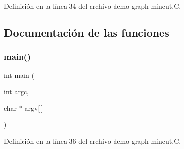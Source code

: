 Definición en la línea 34 del archivo demo-\/graph-\/mincut.\+C.



\subsection{Documentación de las funciones}
\mbox{\label{demo-graph-mincut_8_c_a0ddf1224851353fc92bfbff6f499fa97}} 
\subsubsection{\texorpdfstring{main()}{main()}}
{\footnotesize\ttfamily int main (\begin{DoxyParamCaption}\item[{int}]{argc,  }\item[{char $\ast$}]{argv\mbox{[}$\,$\mbox{]} }\end{DoxyParamCaption})}



Definición en la línea 36 del archivo demo-\/graph-\/mincut.\+C.

